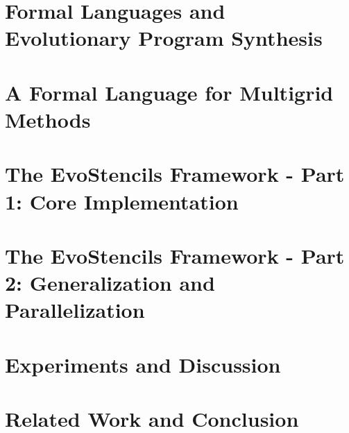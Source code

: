 \documentclass[
  paper = 17x24,
  language = english,
  acronym = split,
  acronymline = novertical,
  bibliography = combined,
  bibliographypart = all,
  titlesize = Huge,
  par = halfskip,
]{faupress}
\theoremstyle{definition}
\numberwithin{equation}{chapter}
\begin{document}
\chapter{Formal Languages and Evolutionary Program Synthesis}
\label{chapter:formal-languages-and-gp}
  
  
\chapter{A Formal Language for Multigrid Methods}
\label{chapter:multigrid-formal-language}
  
\chapter{The EvoStencils Framework - Part 1: Core Implementation}
\label{chapter:evostencils-1}
  
  \label{chapter:evostencils-2}
\chapter{The EvoStencils Framework - Part 2: Generalization and Parallelization}
  
\chapter{Experiments and Discussion}
\label{chapter:experiments}
  
\chapter{Related Work and Conclusion}
  
  


\appendix 
  
  
    
\backmatter
  \faupressprintbibliography
\end{document}
